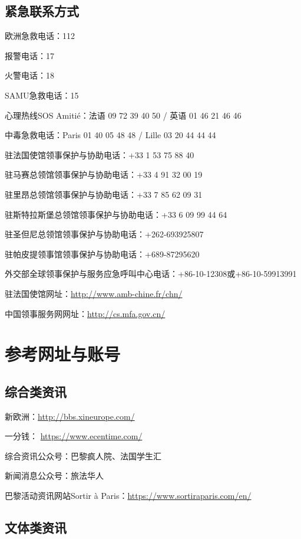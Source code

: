 \documentclass[UTF8]{ctexart}
\begin{document}
\subsection{紧急联系方式}

欧洲急救电话：112

报警电话：17 

火警电话：18 

SAMU急救电话：15 

心理热线SOS Amitié：法语 09 72 39 40 50 / 英语 01 46 21 46 46

中毒急救电话：Paris 01 40 05 48 48 / Lille 03 20 44 44 44

驻法国使馆领事保护与协助电话：+33 1 53 75 88 40

驻马赛总领馆领事保护与协助电话：+33 4 91 32 00 19

驻里昂总领馆领事保护与协助电话：+33 7 85 62 09 31

驻斯特拉斯堡总领馆领事保护与协助电话：+33 6 09 99 44 64

驻圣但尼总领馆领事保护与协助电话：+262-693925807

驻帕皮提领事馆领事保护与协助电话：+689-87295620

外交部全球领事保护与服务应急呼叫中心电话：+86-10-12308或+86-10-59913991

驻法国使馆网址：\href{http://www.amb-chine.fr/chn/}{http://www.amb-chine.fr/chn/} 

中国领事服务网网址：\href{http://cs.mfa.gov.cn/}{http://cs.mfa.gov.cn/} 

\newpage
\section{参考网址与账号}

\subsection{综合类资讯}
新欧洲：\href{http://bbs.xineurope.com/}{http://bbs.xineurope.com/} 

一分钱： \href{https://www.ecentime.com/}{https://www.ecentime.com/} 

综合资讯公众号：巴黎疯人院、法国学生汇

新闻消息公众号：旅法华人

巴黎活动资讯网站Sortir à Paris：\href{https://www.sortiraparis.com/en/}{https://www.sortiraparis.com/en/}

\subsection{文体类资讯}
\end{document}
